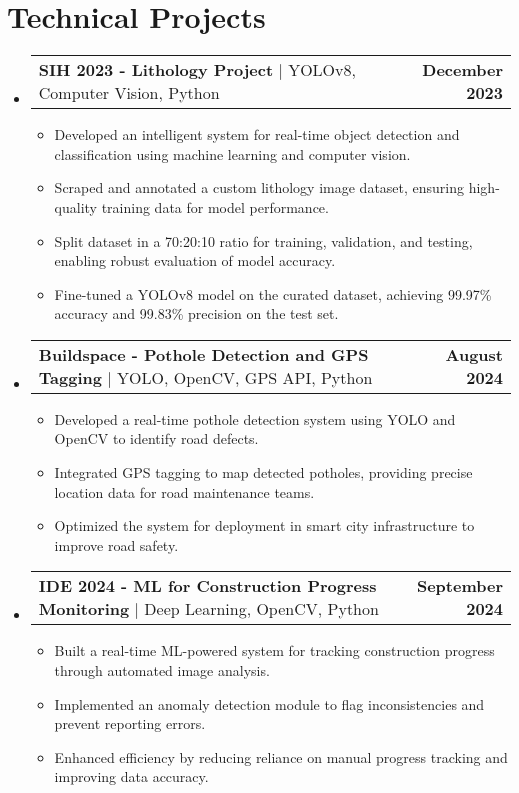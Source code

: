 \documentclass[letterpaper,11pt]{article}
\makeatletter
\newcommand{\resumeItem}[1]{
  \item\small{
    {#1 \vspace{-2pt}}
  }
}
\newcommand{\resumeProjectHeading}[2]{
  \item
  \begin{tabular*}{1.0\textwidth}{l@{\extracolsep{\fill}}r}
    \small#1 & \textbf{\small #2}\\
  \end{tabular*}\vspace{-7pt}
}
\newcommand{\resumeSubHeadingListStart}{\begin{itemize}[leftmargin=0.0in, label={}]}
\newcommand{\resumeSubHeadingListEnd}{\end{itemize}}
\newcommand{\resumeItemListStart}{\begin{itemize}}
\newcommand{\resumeItemListEnd}{\end{itemize}\vspace{-5pt}}
\makeatother
\begin{document}
\section{Technical Projects}
\resumeSubHeadingListStart
  \resumeProjectHeading
    {\textbf{SIH 2023 - Lithology Project} $|$ YOLOv8, Computer Vision, Python}{December 2023}
    \resumeItemListStart
      \resumeItem{Developed an intelligent system for real-time object detection and classification using machine learning and computer vision.}
      \resumeItem{Scraped and annotated a custom lithology image dataset, ensuring high-quality training data for model performance.}
      \resumeItem{Split dataset in a 70:20:10 ratio for training, validation, and testing, enabling robust evaluation of model accuracy.}
      \resumeItem{Fine-tuned a YOLOv8 model on the curated dataset, achieving 99.97\% accuracy and 99.83\% precision on the test set.}
    \resumeItemListEnd

  \resumeProjectHeading
    {\textbf{Buildspace - Pothole Detection and GPS Tagging} $|$ YOLO, OpenCV, GPS API, Python}{August 2024}
    \resumeItemListStart
      \resumeItem{Developed a real-time pothole detection system using YOLO and OpenCV to identify road defects.}
      \resumeItem{Integrated GPS tagging to map detected potholes, providing precise location data for road maintenance teams.}
      \resumeItem{Optimized the system for deployment in smart city infrastructure to improve road safety.}
    \resumeItemListEnd

  \resumeProjectHeading
    {\textbf{IDE 2024 - ML for Construction Progress Monitoring} $|$ Deep Learning, OpenCV, Python}{September 2024}
    \resumeItemListStart
      \resumeItem{Built a real-time ML-powered system for tracking construction progress through automated image analysis.}
      \resumeItem{Implemented an anomaly detection module to flag inconsistencies and prevent reporting errors.}
      \resumeItem{Enhanced efficiency by reducing reliance on manual progress tracking and improving data accuracy.}
    \resumeItemListEnd


    
\resumeSubHeadingListEnd

\end{document}
